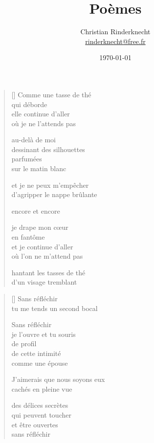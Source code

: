 \documentclass[12pt,a4paper]{article}
\title{Poèmes}
\author{Christian Rinderknecht\\
{\small \url{rinderknecht@free.fr}}}
\date{\today}
\begin{document}
\maketitle

\thispagestyle{empty}

\newpage\leavevmode\thispagestyle{empty}\newpage


\newpage

\poemtitle{}

\settowidth{\versewidth}{d'agripper le nappe brûlante}

\bigskip

\begin{verse}[\versewidth]
  Comme une tasse de thé \\
  qui déborde \\

  elle continue d'aller \\
  où je ne l'attends pas

  au-delà de moi \\
  dessinant des silhouettes \\
  parfumées \\
  sur le matin blanc

  et je ne peux m'empêcher \\
  d'agripper le nappe brûlante

  encore et encore

  je drape mon cœur \\
  en fantôme \\
  et je continue d'aller \\
  où l'on ne m'attend pas

  hantant les tasses de thé \\
  d'un visage tremblant
\end{verse}


\newpage

\poemtitle{}

\settowidth{\versewidth}{J'aimerais que nous soyons eux}

\bigskip

\begin{verse}[\versewidth]
  Sans réfléchir \\
  tu me tends un second bocal

  Sans réfléchir \\
  je l'ouvre et tu souris \\
  de profil \\
  de cette intimité \\
  comme une épouse

  J'aimerais que nous soyons eux \\

  cachés en pleine vue

  des délices secrètes \\
  qui peuvent toucher \\
  et être ouvertes \\
  sans réfléchir
\end{verse}
\end{document}

